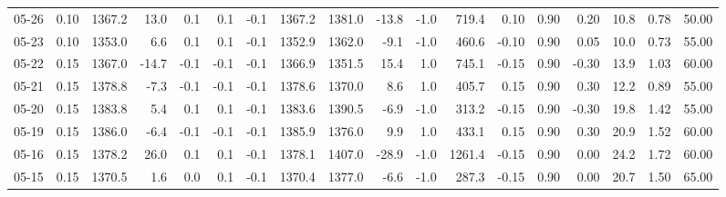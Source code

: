 \begin{threeparttable}
{\begin{tabular}{lrrrrrrrrrrrrrrrrr}
  05-26 &     0.10 & 1367.2 &              13.0 &               0.1 &                0.1 &               -0.1 & 1367.2 & 1381.0 &      -13.8 &                     -1.0 &               719.4 &       0.10 &      0.90 &           0.20 &             10.8 &            0.78 &                  50.00 \\
  05-23 &     0.10 & 1353.0 &               6.6 &               0.1 &                0.1 &               -0.1 & 1352.9 & 1362.0 &       -9.1 &                     -1.0 &               460.6 &      -0.10 &      0.90 &           0.05 &             10.0 &            0.73 &                  55.00 \\
  05-22 &     0.15 & 1367.0 &             -14.7 &              -0.1 &               -0.1 &               -0.1 & 1366.9 & 1351.5 &       15.4 &                      1.0 &               745.1 &      -0.15 &      0.90 &          -0.30 &             13.9 &            1.03 &                  60.00 \\
  05-21 &     0.15 & 1378.8 &              -7.3 &              -0.1 &               -0.1 &               -0.1 & 1378.6 & 1370.0 &        8.6 &                      1.0 &               405.7 &       0.15 &      0.90 &           0.30 &             12.2 &            0.89 &                  55.00 \\
  05-20 &     0.15 & 1383.8 &               5.4 &               0.1 &                0.1 &               -0.1 & 1383.6 & 1390.5 &       -6.9 &                     -1.0 &               313.2 &      -0.15 &      0.90 &          -0.30 &             19.8 &            1.42 &                  55.00 \\
  05-19 &     0.15 & 1386.0 &              -6.4 &              -0.1 &               -0.1 &               -0.1 & 1385.9 & 1376.0 &        9.9 &                      1.0 &               433.1 &       0.15 &      0.90 &           0.30 &             20.9 &            1.52 &                  60.00 \\
  05-16 &     0.15 & 1378.2 &              26.0 &               0.1 &                0.1 &               -0.1 & 1378.1 & 1407.0 &      -28.9 &                     -1.0 &              1261.4 &      -0.15 &      0.90 &           0.00 &             24.2 &            1.72 &                  60.00 \\
  05-15 &     0.15 & 1370.5 &               1.6 &               0.0 &                0.1 &               -0.1 & 1370.4 & 1377.0 &       -6.6 &                     -1.0 &               287.3 &      -0.15 &      0.90 &           0.00 &             20.7 &            1.50 &                  65.00 \\

\end{tabular}}
\end{threeparttable}
